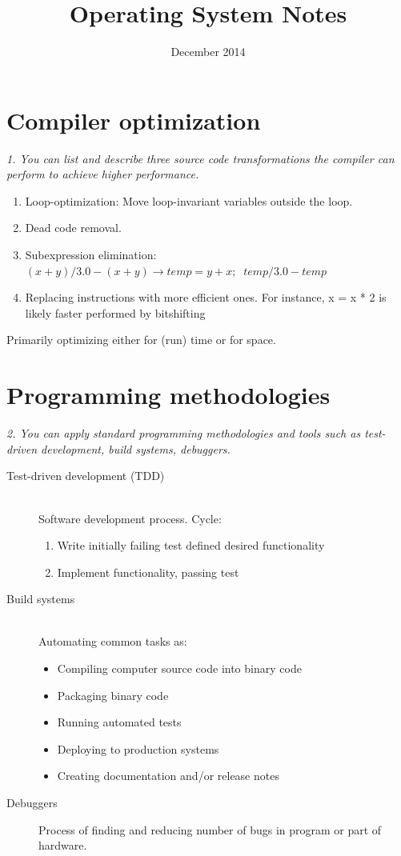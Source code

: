 \documentclass{article}
\title{Operating System Notes}
\author{December 2014}
\date{}
\begin{document}
\maketitle
\tableofcontents
\pagebreak

\section{Compiler optimization}
\emph{1. You can list and describe three source code transformations the compiler can perform to achieve higher performance.}

\begin{enumerate}
	\item Loop-optimization: Move loop-invariant variables outside the loop.
	\item Dead code removal.
	\item Subexpression elimination: $(x + y) / 3.0 - (x + y)\rightarrow temp = y+x;\;\; temp/3.0-temp$
	\item Replacing instructions with more efficient ones. For instance, x = x * 2 is likely faster performed by bitshifting
\end{enumerate}

Primarily optimizing either for (run) time or for space.


\section{Programming methodologies}
\emph{2. You can apply standard programming methodologies and tools such as test-driven development, build systems, debuggers.}

\begin{description}
\item[Test-driven development (TDD)] \ \\
Software development process. Cycle:
\begin{enumerate}
\item Write initially failing test defined desired functionality
\item Implement functionality, passing test
\end{enumerate}

\item[Build systems] \ \\
Automating common tasks as:
\begin{itemize}
\item Compiling computer source code into binary code
\item Packaging binary code
\item Running automated tests
\item Deploying to production systems
\item Creating documentation and/or release notes
\end{itemize}

\item[Debuggers] Process of finding and reducing number of bugs in program or part of hardware.
\end{description}
\end{document}
